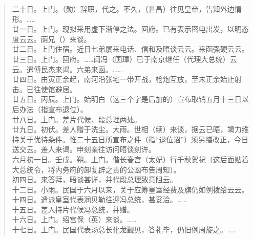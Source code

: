 \begin{quote}
	二十日。上门。（勋）辞职，代之。不久，（世昌）往见皇帝，告知外边情形。……\\

廿一日。上门。现拟采用虚下渐停之法。回府。已有表示密电出发，以明态度云云。荫兄（）来谈。\\

廿二日。上门住宿。近日七弟屡来电话、信和及晤谈云云。来函强硬云云。\\

廿三日。上门。回府。……闻冯（国璋）已于南京继任（代理大总统）云云。遣傅民杰来谒。六弟来函。……\\

廿四日。由寅正余起，南河沿张宅一带开战，枪炮互放，至未正余始止射击。已往使馆避居。\\

廿五日。丙辰。上门。始明白（这三个字是后加的）宣布取销五月十三日以后办法（指宣布退位）。\\

廿八日。上门。差片代候、段总理两处。\\

廿九日。初伏。差人赠于洗尘。大雨。世相（续）来谈，据云已晤，竭力维持关于优待条件。惟二十五日所宣布之件（指“退位诏”）须另缮改正，今日送交云。差人来谒。申刻亲往访问晤谈刻许。\\

六月初一日。壬戌。朔。上门。偕长春宫（太妃）行千秋贺祝（这后面贴着大总统令，将内务府的卸复辟之责的公函布告周知）。\\

初四日。来答拜，晤谈甚详，并代段总理致意阻云。\\

十二日。小雨。民国于六月以来，关于应筹皇室经费及旗仍如例拨给云云。\\

十四日。遣派皇室代表润贝勒往迎冯总统，甚妥洽。……\\

十五日。差人持片代候冯总统，并赠。\\

十六日。上门。绍宫保（英）来谈。……\\

十七日。上门。民国代表汤总长化龙觐见，答礼毕，仍旧例周旋之。……\\


\end{quote}

